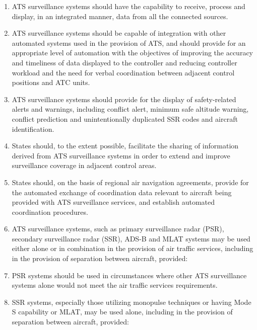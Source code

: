 \documentclass[../vATM.tex]{subfiles}
\begin{document}
\begin{enumerate}[label=\arabic{section}.\arabic{subsection}.\arabic*]
        \item ATS surveillance systems should have the capability to receive, process and display, in an integrated manner, data from all the connected sources.
        \item ATS surveillance systems should be capable of integration with other automated systems used in the provision of ATS, and should provide for an appropriate level of automation with the objectives of improving the accuracy and timeliness of data displayed to the controller and reducing controller workload and the need for verbal coordination between adjacent control positions and ATC units.
        \item ATS surveillance systems should provide for the display of safety-related alerts and warnings, including conflict alert, minimum safe altitude warning, conflict prediction and unintentionally duplicated SSR codes and aircraft identification.
        \item States should, to the extent possible, facilitate the sharing of information derived from ATS surveillance systems in order to extend and improve surveillance coverage in adjacent control areas.
        \item States should, on the basis of regional air navigation agreements, provide for the automated exchange of coordination data relevant to aircraft being provided with ATS surveillance services, and establish automated coordination procedures.
        \item ATS surveillance systems, such as primary surveillance radar (PSR), secondary surveillance radar (SSR), ADS-B and MLAT systems may be used either alone or in combination in the provision of air traffic services, including in the provision of separation between aircraft, provided:


        \item PSR systems should be used in circumstances where other ATS surveillance systems alone would not meet the air traffic services requirements.
        \item SSR systems, especially those utilizing monopulse techniques or having Mode S capability or MLAT, may be used alone, including in the provision of separation between aircraft, provided:


\end{enumerate}
\end{document}
